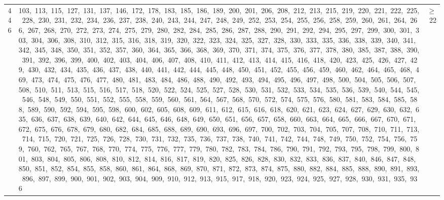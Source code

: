 \begin{longtable}{c|p{}|r}
446 & 103,\ 113,\ 115,\ 127,\ 131,\ 137,\ 146,\ 172,\ 178,\ 183,\ 185,\ 186,\ 189,\ 200,\ 201,\ 206,\ 208,\ 212,\ 213,\ 215,\ 219,\ 220,\ 221,\ 222,\ 225,\ 228,\ 230,\ 231,\ 232,\ 234,\ 236,\ 237,\ 238,\ 240,\ 243,\ 244,\ 247,\ 248,\ 249,\ 252,\ 253,\ 254,\ 255,\ 256,\ 258,\ 259,\ 260,\ 261,\ 264,\ 266,\ 267,\ 268,\ 270,\ 272,\ 273,\ 274,\ 275,\ 279,\ 280,\ 282,\ 284,\ 285,\ 286,\ 287,\ 288,\ 290,\ 291,\ 292,\ 294,\ 295,\ 297,\ 299,\ 300,\ 301,\ 303,\ 304,\ 306,\ 308,\ 310,\ 312,\ 315,\ 316,\ 318,\ 319,\ 320,\ 322,\ 323,\ 324,\ 325,\ 327,\ 328,\ 330,\ 333,\ 335,\ 336,\ 338,\ 339,\ 340,\ 341,\ 342,\ 345,\ 348,\ 350,\ 351,\ 352,\ 357,\ 360,\ 364,\ 365,\ 366,\ 368,\ 369,\ 370,\ 371,\ 374,\ 375,\ 376,\ 377,\ 378,\ 380,\ 385,\ 387,\ 388,\ 390,\ 391,\ 392,\ 396,\ 399,\ 400,\ 402,\ 403,\ 404,\ 406,\ 407,\ 408,\ 410,\ 411,\ 412,\ 413,\ 414,\ 415,\ 416,\ 418,\ 420,\ 423,\ 425,\ 426,\ 427,\ 429,\ 430,\ 432,\ 434,\ 435,\ 436,\ 437,\ 438,\ 440,\ 441,\ 442,\ 444,\ 445,\ 448,\ 450,\ 451,\ 452,\ 455,\ 456,\ 459,\ 460,\ 462,\ 464,\ 465,\ 468,\ 469,\ 473,\ 474,\ 475,\ 476,\ 477,\ 480,\ 481,\ 483,\ 484,\ 486,\ 488,\ 490,\ 492,\ 493,\ 494,\ 495,\ 496,\ 497,\ 498,\ 500,\ 504,\ 505,\ 506,\ 507,\ 508,\ 510,\ 511,\ 513,\ 515,\ 516,\ 517,\ 518,\ 520,\ 522,\ 524,\ 525,\ 527,\ 528,\ 530,\ 531,\ 532,\ 533,\ 534,\ 535,\ 536,\ 539,\ 540,\ 544,\ 545,\ 546,\ 548,\ 549,\ 550,\ 551,\ 552,\ 555,\ 558,\ 559,\ 560,\ 561,\ 564,\ 567,\ 568,\ 570,\ 572,\ 574,\ 575,\ 576,\ 580,\ 581,\ 583,\ 584,\ 585,\ 588,\ 589,\ 590,\ 592,\ 594,\ 595,\ 598,\ 600,\ 602,\ 605,\ 608,\ 609,\ 611,\ 612,\ 615,\ 616,\ 618,\ 620,\ 621,\ 623,\ 624,\ 627,\ 629,\ 630,\ 632,\ 635,\ 636,\ 637,\ 638,\ 639,\ 640,\ 642,\ 644,\ 645,\ 646,\ 648,\ 649,\ 650,\ 651,\ 656,\ 657,\ 658,\ 660,\ 663,\ 664,\ 665,\ 666,\ 667,\ 670,\ 671,\ 672,\ 675,\ 676,\ 678,\ 679,\ 680,\ 682,\ 684,\ 685,\ 688,\ 689,\ 690,\ 693,\ 696,\ 697,\ 700,\ 702,\ 703,\ 704,\ 705,\ 707,\ 708,\ 710,\ 711,\ 713,\ 714,\ 715,\ 720,\ 721,\ 725,\ 726,\ 728,\ 730,\ 731,\ 732,\ 735,\ 736,\ 737,\ 738,\ 740,\ 741,\ 742,\ 744,\ 748,\ 749,\ 750,\ 752,\ 754,\ 756,\ 759,\ 760,\ 762,\ 765,\ 767,\ 768,\ 770,\ 774,\ 775,\ 776,\ 777,\ 779,\ 780,\ 782,\ 783,\ 784,\ 786,\ 790,\ 791,\ 792,\ 793,\ 795,\ 798,\ 799,\ 800,\ 801,\ 803,\ 804,\ 805,\ 806,\ 808,\ 810,\ 812,\ 814,\ 816,\ 817,\ 819,\ 820,\ 825,\ 826,\ 828,\ 830,\ 832,\ 833,\ 836,\ 837,\ 840,\ 846,\ 847,\ 848,\ 850,\ 851,\ 852,\ 854,\ 855,\ 858,\ 860,\ 861,\ 864,\ 868,\ 869,\ 870,\ 871,\ 872,\ 873,\ 874,\ 875,\ 880,\ 882,\ 884,\ 885,\ 888,\ 890,\ 891,\ 893,\ 896,\ 897,\ 899,\ 900,\ 901,\ 902,\ 903,\ 904,\ 909,\ 910,\ 912,\ 913,\ 915,\ 917,\ 918,\ 920,\ 923,\ 924,\ 925,\ 927,\ 928,\ 930,\ 931,\ 935,\ 936 & $\ge$ 22 \\

\end{longtable}
